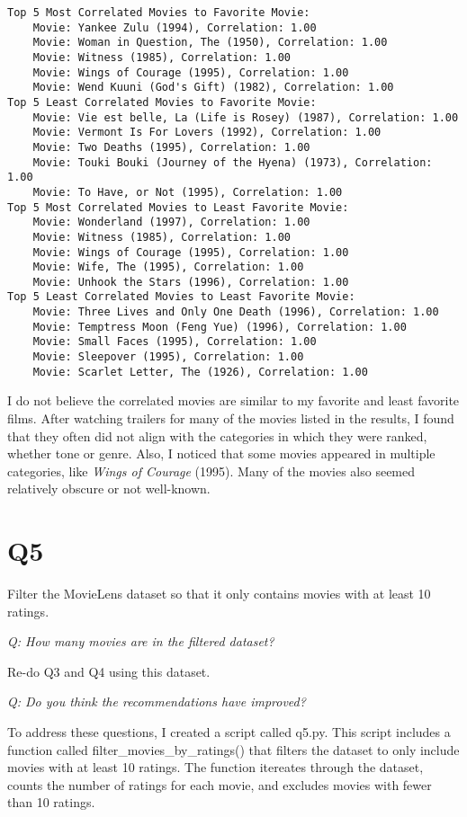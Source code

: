\documentclass[12pt]{article}
\begin{document}
\begin{verbatim}
Top 5 Most Correlated Movies to Favorite Movie:
    Movie: Yankee Zulu (1994), Correlation: 1.00
    Movie: Woman in Question, The (1950), Correlation: 1.00
    Movie: Witness (1985), Correlation: 1.00
    Movie: Wings of Courage (1995), Correlation: 1.00
    Movie: Wend Kuuni (God's Gift) (1982), Correlation: 1.00
Top 5 Least Correlated Movies to Favorite Movie:
    Movie: Vie est belle, La (Life is Rosey) (1987), Correlation: 1.00
    Movie: Vermont Is For Lovers (1992), Correlation: 1.00
    Movie: Two Deaths (1995), Correlation: 1.00
    Movie: Touki Bouki (Journey of the Hyena) (1973), Correlation: 1.00
    Movie: To Have, or Not (1995), Correlation: 1.00
Top 5 Most Correlated Movies to Least Favorite Movie:
    Movie: Wonderland (1997), Correlation: 1.00
    Movie: Witness (1985), Correlation: 1.00
    Movie: Wings of Courage (1995), Correlation: 1.00
    Movie: Wife, The (1995), Correlation: 1.00
    Movie: Unhook the Stars (1996), Correlation: 1.00
Top 5 Least Correlated Movies to Least Favorite Movie:
    Movie: Three Lives and Only One Death (1996), Correlation: 1.00
    Movie: Temptress Moon (Feng Yue) (1996), Correlation: 1.00
    Movie: Small Faces (1995), Correlation: 1.00
    Movie: Sleepover (1995), Correlation: 1.00
    Movie: Scarlet Letter, The (1926), Correlation: 1.00    
\end{verbatim}

I do not believe the correlated movies are similar to my favorite and least favorite films. After watching trailers for many of the movies listed in the results, I found that they often did not align with the categories in which they were ranked, whether tone or genre. Also, I noticed that some movies appeared in multiple categories, like \emph{Wings of Courage} (1995). Many of the movies also seemed relatively obscure or not well-known.

\section*{Q5}

Filter the MovieLens dataset so that it only contains movies with at least 10 ratings.

\emph{Q: How many movies are in the filtered dataset?}

Re-do Q3 and Q4 using this dataset.

\emph{Q: Do you think the recommendations have improved?}

To address these questions, I created a script called q5.py. This script includes a function called filter\_movies\_by\_ratings() that filters the dataset to only include movies with at least 10 ratings. The function itereates through the dataset, counts the number of ratings for each movie, and excludes movies with fewer than 10 ratings. 
\end{document}
